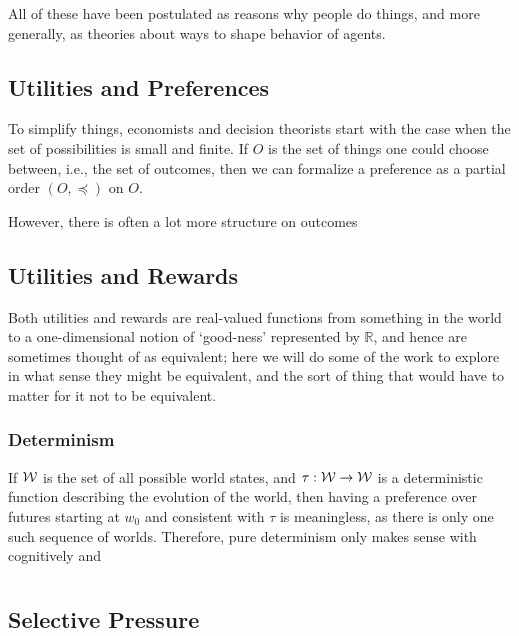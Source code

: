 \documentclass{book}
\begin{document}
	
	
	All of these have been postulated as reasons why people do things, and more generally, as theories about ways to shape behavior of agents. 
	
	
	
	
	\subsection{Utilities and Preferences}
	
	To simplify things, economists and decision theorists start with the case when the set of possibilities is small and finite. If $O$ is the set of things one could choose between, i.e., the set of outcomes, then we can formalize a preference as a partial order $(O, \preccurlyeq)$ on $O$.
	
	However, there is often a lot more structure on outcomes
	
	\subsection{Utilities and Rewards}
	
	Both utilities and rewards are real-valued functions from something in the world to a one-dimensional notion of `good-ness' represented by $\mathbb R$, and hence are sometimes thought of as equivalent; here we will do some of the work to explore in what sense they might be equivalent, and the sort of thing that would have to matter for it not to be equivalent. 
	
	\subsubsection{Determinism}
	If $\cal W$ is the set of all possible world states, and $\tau: \cal W \to W$ is a deterministic function describing the evolution of the world, then having a preference over futures starting at $w_0$ and consistent with $\tau$ is meaningless, as there is only one such sequence of worlds. Therefore, pure determinism only makes sense with cognitively and 
	
	
	\section{}
	
	\subsection{Selective Pressure}
\end{document}
